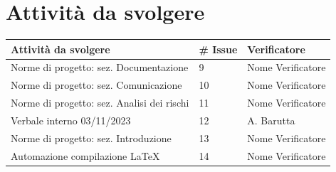 \documentclass{article}
\begin{document}
\section{Attività da svolgere}
\begin{center}
    \begin{tabular}{|C{7cm}|C{1,5cm}|C{3cm}|}
        \hline
        \textbf{Attività da svolgere} & \textbf{\# Issue} & \textbf{Verificatore} \\
        \hline
        \hline
        Norme di progetto: sez. Documentazione & 9 & Nome Verificatore\\
        Norme di progetto: sez. Comunicazione & 10 & Nome Verificatore\\
        Norme di progetto: sez. Analisi dei rischi & 11 & Nome Verificatore\\
        Verbale interno 03/11/2023 & 12 & A. Barutta\\
        Norme di progetto: sez. Introduzione & 13 & Nome Verificatore\\
        Automazione compilazione LaTeX & 14 & Nome Verificatore\\
        \hline
    \end{tabular}
\end{center}
    
\end{document}
